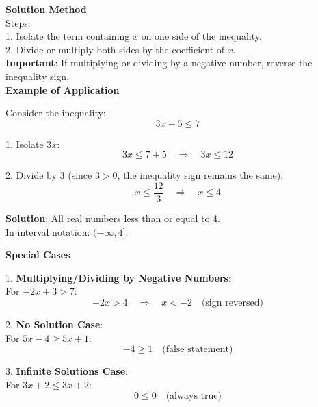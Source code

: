 \documentclass{article} %
\begin{document}
\textbf{Solution Method}\\
Steps:\\
1. Isolate the term containing $x$ on one side of the inequality.\\

2. Divide or multiply both sides by the coefficient of $x$.\\
   \textbf{Important}: If multiplying or dividing by a negative number, reverse the inequality sign.\\

\textbf{Example of Application}

Consider the inequality:
\[
3x - 5 \leq 7
\]

1. Isolate $3x$:
\[
3x \leq 7 + 5 \quad \Rightarrow \quad 3x \leq 12
\]

2. Divide by 3 (since $3 > 0$, the inequality sign remains the same):
\[
x \leq \frac{12}{3} \quad \Rightarrow \quad x \leq 4
\]

\textbf{Solution}: All real numbers less than or equal to 4.\\
In interval notation: $(-\infty, 4]$.

\textbf{Special Cases}

1. \textbf{Multiplying/Dividing by Negative Numbers}:\\
For $-2x + 3 > 7$:
\[
-2x > 4 \quad \Rightarrow \quad x < -2 \quad \text{(sign reversed)}
\]

2. \textbf{No Solution Case}:\\
For $5x - 4 \geq 5x + 1$:
\[
-4 \geq 1 \quad \text{(false statement)}
\]

3. \textbf{Infinite Solutions Case}:\\
For $3x + 2 \leq 3x + 2$:
\[
0 \leq 0 \quad \text{(always true)}
\]
\end{document}
